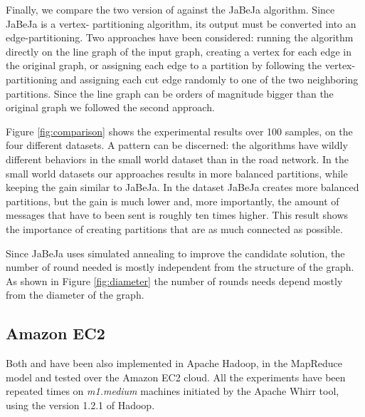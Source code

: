 Finally, we compare the 
two version of \dfep against the JaBeJa\cite{Rahimian2013} algorithm. Since JaBeJa is a vertex-
partitioning algorithm, its output must be converted into an edge-partitioning. 
Two approaches have been considered: running the algorithm directly on the line 
graph of the input graph, creating a vertex for each edge in the original graph, or 
assigning each edge to a partition by following the vertex-partitioning and 
assigning each cut edge randomly to one of the two neighboring partitions. Since 
the line graph can be orders of magnitude bigger than the original graph we followed the second approach.

Figure \ref{fig:comparison}
shows the experimental results over 100 samples, on the four different datasets.
A pattern can be discerned: the algorithms have wildly different behaviors in the 
small world dataset than in the road network. In the small world datasets our 
approaches results in more balanced partitions, while keeping the gain similar to 
JaBeJa. In the  dataset JaBeJa creates more balanced
partitions, but the gain is much lower and, more importantly, the amount of
messages that have to been sent is roughly ten times higher. This result shows
the importance of creating partitions that are as much connected as possible.

Since JaBeJa uses simulated annealing to improve the candidate solution, the
number of round needed is mostly independent from the structure of the graph.
As shown in Figure \ref{fig:diameter} the number of rounds \dfep needs depend mostly
from the diameter of the graph.



\subsection{Amazon EC2}

Both \dfep and \etsch have been also implemented in Apache Hadoop, in the
MapReduce model and tested over the Amazon EC2 cloud. All the experiments have
been repeated  times on \emph{m1.medium} machines initiated by the Apache
Whirr tool, using the version 1.2.1 of Hadoop.

